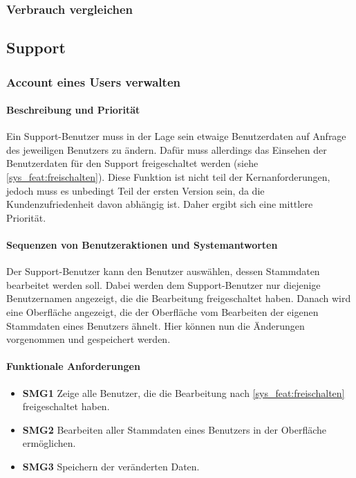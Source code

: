 \subsubsection{Verbrauch vergleichen}


\subsection{Support}
\subsubsection{Account eines Users verwalten}
\paragraph{Beschreibung und Priorität}
Ein Support-Benutzer muss in der Lage sein etwaige Benutzerdaten auf Anfrage des jeweiligen Benutzers zu ändern. Dafür muss allerdings das Einsehen der Benutzerdaten für den Support freigeschaltet werden (siehe \ref{sys_feat:freischalten}). Diese Funktion ist nicht teil der Kernanforderungen, jedoch muss es unbedingt Teil der ersten Version sein, da die Kundenzufriedenheit davon abhängig ist. Daher ergibt sich eine mittlere Priorität.
\paragraph{Sequenzen von Benutzeraktionen und Systemantworten}
Der Support-Benutzer kann den Benutzer auswählen, dessen Stammdaten bearbeitet werden soll. Dabei werden dem Support-Benutzer nur diejenige Benutzernamen angezeigt, die die Bearbeitung freigeschaltet haben. Danach wird eine Oberfläche angezeigt, die der Oberfläche vom Bearbeiten der eigenen Stammdaten eines Benutzers ähnelt. Hier können nun die Änderungen vorgenommen und gespeichert werden. 
\paragraph{Funktionale Anforderungen}
\begin{itemize}
	\item \textbf{SMG1} Zeige alle Benutzer, die die Bearbeitung nach \ref{sys_feat:freischalten} freigeschaltet haben.
	\item \textbf{SMG2} Bearbeiten aller Stammdaten eines Benutzers in der Oberfläche ermöglichen.
	\item \textbf{SMG3} Speichern der veränderten Daten. 
\end{itemize}

